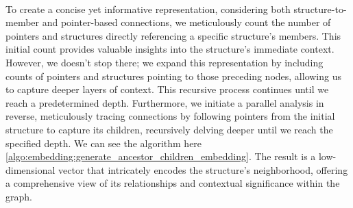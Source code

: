     \paragraph{}To create a concise yet informative representation, considering both structure-to-member and pointer-based connections, we meticulously count the number of \glspl{pointer} and \glspl{structure} directly referencing a specific \gls{structure}'s members. This initial count provides valuable insights into the \gls{structure}'s immediate context. However, we doesn't stop there; we expand this representation by including counts of \glspl{pointer} and \glspl{structure} pointing to those preceding nodes, allowing us to capture deeper layers of context. This recursive process continues until we reach a predetermined depth. Furthermore, we initiate a parallel analysis in reverse, meticulously tracing connections by following \glspl{pointer} from the initial \gls{structure} to capture its children, recursively delving deeper until we reach the specified depth. We can see the algorithm here \ref{algo:embedding:generate_ancestor_children_embedding}. The result is a low-dimensional vector that intricately encodes the \gls{structure}'s neighborhood, offering a comprehensive view of its relationships and contextual significance within the graph.

